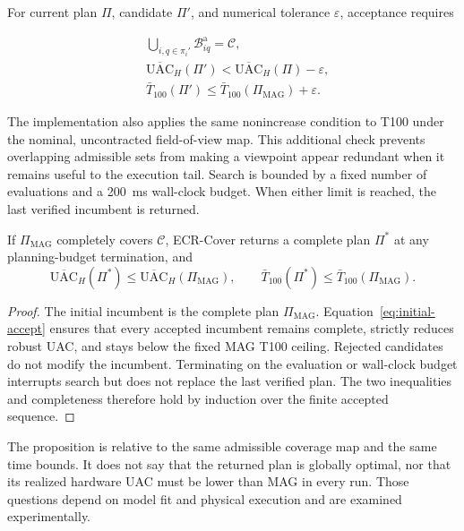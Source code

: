 For current plan $\Pi$, candidate $\Pi'$, and numerical tolerance $\varepsilon$, acceptance requires

\begin{equation}\label{eq:initial-accept}
\begin{aligned}
&\bigcup_{i,q\in\pi_i'}\mathcal B^{\mathrm a}_{iq}=\mathcal C,\\
&\overline{\mathrm{UAC}}_H(\Pi')
<\overline{\mathrm{UAC}}_H(\Pi)-\varepsilon,\\
&\bar T_{100}(\Pi')
\leq\bar T_{100}(\Pi_{\mathrm{MAG}})+\varepsilon.
\end{aligned}
\end{equation}

The implementation also applies the same nonincrease condition to T100 under the nominal, uncontracted field-of-view map. This additional check prevents overlapping admissible sets from making a viewpoint appear redundant when it remains useful to the execution tail. Search is bounded by a fixed number of evaluations and a 200~ms wall-clock budget. When either limit is reached, the last verified incumbent is returned.

\begin{proposition}\label{prop:initial}
If $\Pi_{\mathrm{MAG}}$ completely covers $\mathcal C$, ECR-Cover returns a complete plan $\Pi^*$ at any planning-budget termination, and
\begin{equation}\label{eq:initial-property}
\overline{\mathrm{UAC}}_H(\Pi^*)
\leq\overline{\mathrm{UAC}}_H(\Pi_{\mathrm{MAG}}),\qquad
\bar T_{100}(\Pi^*)
\leq\bar T_{100}(\Pi_{\mathrm{MAG}}).
\end{equation}
\end{proposition}

\begin{proof}
The initial incumbent is the complete plan $\Pi_{\mathrm{MAG}}$. Equation~\eqref{eq:initial-accept} ensures that every accepted incumbent remains complete, strictly reduces robust UAC, and stays below the fixed MAG T100 ceiling. Rejected candidates do not modify the incumbent. Terminating on the evaluation or wall-clock budget interrupts search but does not replace the last verified plan. The two inequalities and completeness therefore hold by induction over the finite accepted sequence.
\end{proof}

The proposition is relative to the same admissible coverage map and the same time bounds. It does not say that the returned plan is globally optimal, nor that its realized hardware UAC must be lower than MAG in every run. Those questions depend on model fit and physical execution and are examined experimentally.

